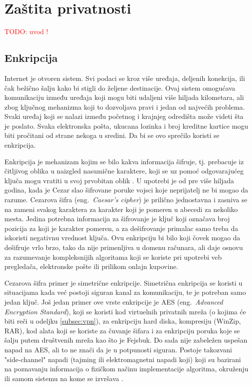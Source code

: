 \documentclass[a4paper]{article}
\newcommand\todos[1]{\textcolor{red}{#1}}
\begin{document}
\section{Zaštita privatnosti}
\label{sec:zastita}

\todos{TODO: uvod !}

\subsection{Enkripcija} 
Internet je otvoren sistem. Svi podaci se kroz više uređaja, deljenih konekcija, ili čak bežično šalju kako bi stigli do željene destinacije. Ovaj sistem omogućava komunikaciju između uređaja koji mogu biti udaljeni više hiljada kilometara, ali zbog ključnog mehanizma koji to dozvoljava pravi i jedan od najvećih problema. Svaki uređaj koji se nalazi između početnog i krajnjeg  odredišta može videti šta je poslato. Svaka elektronska pošta, ukucana lozinka i broj kreditne kartice mogu biti pročitani od strane nekoga u sredini. Da bi se ovo sprečilo koristi se enkripcija.
\par Enkripcija je mehanizam kojim se bilo kakva informacija šifruje, tj. prebacuje iz čitljivog oblika u naizgled nasumične karaktere, koji se uz pomoć odgovarajućeg ključa mogu vratiti u svoj prvobitan oblik \cite{dataencryption}. U upotrebi je od pre više hiljada godina, kada je Cezar slao šifrovane poruke vojsci koje neprijatelj ne bi mogao da razume. Cezarova šifra (eng.~{\em Caesar's cipher}) je prilično jednostavna i zasniva se na zameni svakog karaktera za karakter koji je pomeren u abecedi za nekoliko mesta. Jedina potrebna informacija za šifrovanje je ključ koji označava broj pozicija za koji je karakter pomeren, a za dešifrovanje primalac samo treba da iskoristi negativnu vrednost ključa. Ovu enkripciju bi bilo koji čovek mogao da dešifruje vrlo brzo, tako da nije primenljiva u domenu računara, ali daje osnovu za razumevanje kompleksnijih algoritama koji se koriste pri upotrebi veb pregledača, elektronske pošte ili prilikom onlajn kupovine.
\par Cezarova šifra primer je simetrične enkripcije. Simetrična enkripcija se koristi u situacijama kada već postoji siguran kanal za komunikaciju, te je potreban samo jedan ključ. Još jedan primer ove vrste enkripcije je AES (eng.~{\em Advanced Encryption Standard}), koji se koristi kod virtuelnih privatnih mreža (o kojima će biti reči u odeljku \ref{subsec:vpn}), za enkripciju hard diska, kompresiju (WinZip, RAR), kod alata koji se koriste za čuvanje šifara i za enkripciju poruka koje se šalju putem društvenih mreža kao što je Fejsbuk. Do sada nije zabeležen uspešan napad na AES, ali to ne znači da je u potpunosti siguran. Postoje takozvani "side-channel" napadi (tajming ili elektromagnetni napadi koji) koji su bazirani na poznavanju informacija o fizičkom načinu implementacije algoritma, okruženju ili samom sistemu na kome se izvršava \cite{aes}. 
\end{document}
